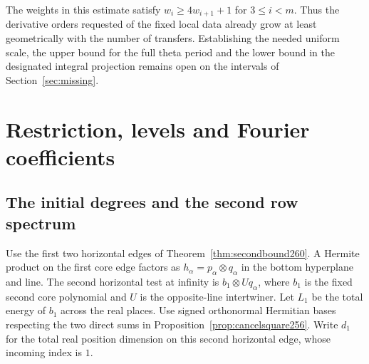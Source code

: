 \documentclass[a4paper,11pt]{article}
\theoremstyle{definition}
\theoremstyle{remark}
\numberwithin{equation}{section}
\begin{document}
The weights in this estimate satisfy \(w_i\ge4w_{i+1}+1\)
for \(3\le i<m\). Thus the derivative orders requested of
the fixed local data already grow at least geometrically
with the number of transfers. Establishing the needed
uniform scale, the upper bound for the full theta period
and the lower bound in the designated integral projection
remains open on the intervals of Section~\ref{sec:missing}.

\section{Restriction, levels and Fourier coefficients}\label{nav:g-VII-4}

\subsection{The initial degrees and the second row spectrum}\label{nav:IX-43}
Use the first two horizontal edges of
Theorem~\ref{thm:secondbound260}. A Hermite product on the
first core edge factors as \(h_\alpha=p_\alpha\otimes q_\alpha\)
in the bottom hyperplane and line. The second horizontal
test at infinity is \(b_1\otimes Uq_\alpha\), where \(b_1\)
is the fixed second core polynomial and \(U\) is the
opposite-line intertwiner. Let \(L_1\) be the total energy
of \(b_1\) across the real places. Use signed orthonormal
Hermitian bases respecting the two direct sums in
Proposition~\ref{prop:cancelsquare256}. Write \(d_1\) for
the total real position dimension on this second horizontal
edge, whose incoming index is \(1\).
\end{document}
